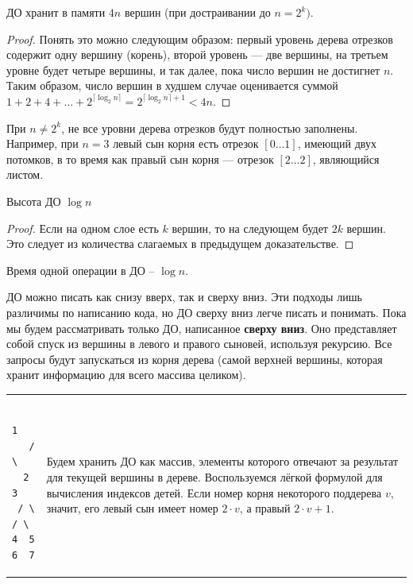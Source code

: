 \begin{Thm}\label{thm@splay}
	ДО хранит в памяти $4n$ вершин (при достраивании до $n=2^k)$.\end{Thm}
\begin{proof}
	Понять это можно следующим образом: первый уровень дерева отрезков содержит одну вершину (корень), второй уровень — две вершины, на третьем уровне будет четыре вершины, и так далее, пока число вершин не достигнет $n$. Таким образом, число вершин в худшем случае оценивается суммой 
	$1 + 2 + 4 + \dots + 2^{\lceil\log_2 n\rceil} = 2^{\lceil\log_2 n\rceil + 1} < 4n$.
\end{proof}

\begin{Rem}При $n \ne 2^k$, не все уровни дерева отрезков будут полностью заполнены. Например, при $n=3$ левый сын корня есть отрезок $[0 \ldots 1]$, имеющий двух потомков, в то время как правый сын корня — отрезок $[2 \ldots 2]$, являющийся листом.
\end{Rem}

\begin{Thm}\label{thm@splay}
	Высота ДО $\log n$\end{Thm}
\begin{proof}
	Если на одном слое есть $k$ вершин, то на следующем будет $2k$ вершин.
	Это следует из количества слагаемых в предыдущем доказательстве.
\end{proof}

\begin{Cons}Время одной операции в ДО -- $\log n$.\end{Cons}

\pagebreak
\up\up\up
{}

ДО можно писать как снизу вверх, так и сверху вниз. Эти подходы лишь различимы по написанию кода, но ДО сверху вниз легче писать и понимать. Пока мы будем рассматривать только ДО, написанное {\bf сверху вниз}. Оно представляет собой спуск из вершины в левого и правого сыновей, используя рекурсию. Все запросы будут запускаться из корня дерева (самой верхней вершины, которая хранит информацию для всего массива целиком).

\down
\begin{tabular}{m{}m{}}
	\begin{minipage}{\textwidth}
\begin{verbatim}
    1  
   / \
  2   3
 / \ / \
4  5 6  7      
\end{verbatim}
	\end{minipage} 
	&
	Будем хранить ДО как массив, элементы которого отвечают за результат для текущей вершины в дереве.
	Воспользуемся лёгкой формулой для вычисления индексов детей. Если номер корня некоторого поддерева $v$, значит, его левый сын имеет номер $2 \cdot v$, а правый $2 \cdot v + 1$.
\end{tabular}
\down

